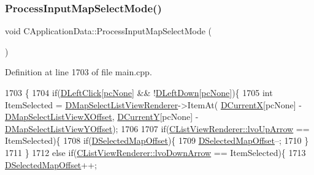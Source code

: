 \subsubsection{\texorpdfstring{Process\+Input\+Map\+Select\+Mode()}{ProcessInputMapSelectMode()}}
{\footnotesize\ttfamily void C\+Application\+Data\+::\+Process\+Input\+Map\+Select\+Mode (\begin{DoxyParamCaption}{ }\end{DoxyParamCaption})\hspace{0.3cm}{\ttfamily [protected]}}



Definition at line 1703 of file main.\+cpp.


\begin{DoxyCode}
1703                                                 \{
1704     \textcolor{keywordflow}{if}(\hyperlink{classCApplicationData_a8a86bb4c7cba7b119121401dda4ca68b}{DLeftClick}[\hyperlink{GameDataTypes_8h_aafb0ca75933357ff28a6d7efbdd7602fa88767aa8e02c7b3192bbab4127b3d729}{pcNone}] && !\hyperlink{classCApplicationData_a2b943f18557c3e4c8cd4550e22e028b6}{DLeftDown}[\hyperlink{GameDataTypes_8h_aafb0ca75933357ff28a6d7efbdd7602fa88767aa8e02c7b3192bbab4127b3d729}{pcNone}])\{
1705         \textcolor{keywordtype}{int} ItemSelected = \hyperlink{classCApplicationData_a5e5746ba44c03038d1a392872614de14}{DMapSelectListViewRenderer}->ItemAt(
      \hyperlink{classCApplicationData_a1dc7ee482a39f7978c71365ac540f97a}{DCurrentX}[pcNone] - \hyperlink{classCApplicationData_aa5a89b442e384acdf1c2aefc7ce4233b}{DMapSelectListViewXOffset}, 
      \hyperlink{classCApplicationData_a0ba39779ae11c8072258c6ddfebd6052}{DCurrentY}[pcNone] - \hyperlink{classCApplicationData_ae1a8eb3fff3cf5bc236564925bec1c8c}{DMapSelectListViewYOffset});
1706         
1707         \textcolor{keywordflow}{if}(\hyperlink{classCListViewRenderer_a120f3c9b0b96dd6e9bce814a52aafb93a097e5e7377e3436187159f67e1aafbe1}{CListViewRenderer::lvoUpArrow} == ItemSelected)\{
1708             \textcolor{keywordflow}{if}(\hyperlink{classCApplicationData_a443edd0c2c7964fc51a82bf2a016725b}{DSelectedMapOffset})\{
1709                 \hyperlink{classCApplicationData_a443edd0c2c7964fc51a82bf2a016725b}{DSelectedMapOffset}--;    
1710             \}
1711         \}
1712         \textcolor{keywordflow}{else} \textcolor{keywordflow}{if}(\hyperlink{classCListViewRenderer_a120f3c9b0b96dd6e9bce814a52aafb93af916162772cb53552d541174c8354036}{CListViewRenderer::lvoDownArrow} == ItemSelected)\{
1713             \hyperlink{classCApplicationData_a443edd0c2c7964fc51a82bf2a016725b}{DSelectedMapOffset}++;

\end{DoxyCode}
